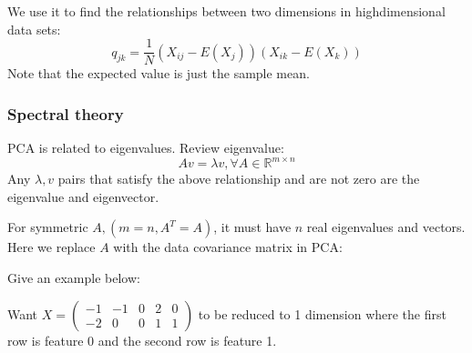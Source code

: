 \documentclass[letterpaper,12pt]{article}
\begin{document}
We use it to find the relationships between two dimensions in high\-dimensional data sets:
\[q_{jk}=\frac{1}{N}(X_{ij}-E(X_j))(X_{ik}-E(X_k))\]
Note that the expected value is just the sample mean.

\subsubsection{Spectral theory}
PCA is related to eigenvalues. Review eigenvalue:
\[Av=\lambda v ,\forall A\in \mathbb{R}^{m\times n}\]
Any $\lambda, v$ pairs that satisfy the above relationship and are not zero are the eigenvalue and eigenvector. 

For symmetric $A, (m=n,A^T=A)$, it must have $n$ real eigenvalues and vectors. Here we replace $A$ with the data covariance matrix in PCA:

Give an example below:

    Want $X =  \begin{pmatrix}
        -1 & -1 & 0 & 2 & 0\\
        -2 & 0 & 0 & 1 & 1
    \end{pmatrix}$ to be reduced to 1 dimension where the first row is feature 0 and the second row is feature 1.
\end{document}
